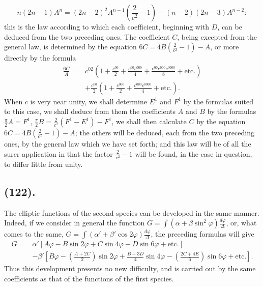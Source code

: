 \documentclass{article}
\begin{document}
\[ n(2n-1)A^{n}=(2n-2)^{2}A^{n-1}\left(\frac{2}{c^{2}}-1\right)-(n-2)(2n-3)A^{n-2}: \]
this is the law according to which each coefficient, beginning with $D$, can be deduced from the two preceding ones. The coefficient $C$, being excepted from the general law, is determined by the equation $6C=4B\left(\frac{2}{c^{2}}-1\right)-A$, or more directly by the formula
\[ \begin{aligned} \frac{6C}{A}={}&c^{02}\left(1+\frac{c^{00}}{2}+\frac{c^{00}c^{000}}{4}+\frac{c^{00}c^{000}c^{0000}}{8}+\text{etc.}\right)\\ &+\frac{c^{00}}{2}\left(1+\frac{c^{000}}{2}+\frac{c^{000}c^{0000}}{4}+\text{etc.}\right). \end{aligned} \]
When $c$ is very near unity, we shall determine $E^{1}$ and $F^{1}$ by the formulas suited to this case, we shall deduce from them the coefficients $A$ and $B$ by the formulas $\frac{\pi}{2}A=F^{1}$, $\frac{\pi}{2}B=\frac{2}{c^{2}}(F^{1}-E^{1})-F^{1}$, we shall then calculate $C$ by the equation $6C=4B\left(\frac{2}{c^{2}}-1\right)-A$; the others will be deduced, each from the two preceding ones, by the general law which we have set forth; and this law will be of all the surer application in that the factor $\frac{2}{c^{2}}-1$ will be found, in the case in question, to differ little from unity.

\subsection*{(122).}

The elliptic functions of the second species can be developed in the same manner. Indeed, if we consider in general the function $G=\displaystyle\int(\alpha+\beta\sin^{2}\varphi)\frac{d\varphi}{\Delta}$, or, what comes to the same, $G=\displaystyle\int(\alpha'+\beta'\cos2\varphi)\frac{d\varphi}{\Delta}$, the preceding formulas will give
\[ \begin{aligned} G={}&\alpha'[A\varphi-B\sin2\varphi+C\sin4\varphi-D\sin6\varphi+\text{etc.}]\\ &-\beta'\left[B\varphi-\left(\frac{A+2C}{2}\right)\sin2\varphi+\frac{B+3D}{4}\sin4\varphi-\left(\frac{2C+4E}{6}\right)\sin6\varphi+\text{etc.}\right]. \end{aligned} \]
Thus this development presents no new difficulty, and is carried out by the same coefficients as that of the functions of the first species.
\end{document}
